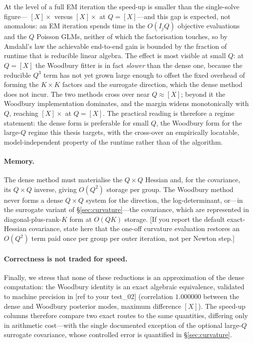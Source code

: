 At the level of a full EM iteration the speed-up is smaller than the single-solve figure---
$[X]\times$ versus $[X]\times$ at $Q=[X]$---and this gap is expected, not anomalous: an EM
iteration spends time in the $O(I_jQ)$ objective evaluations and the $Q$ Poisson GLMs, neither
of which the factorisation touches, so by Amdahl's law the achievable end-to-end gain is
bounded by the fraction of runtime that is reducible linear algebra. The effect is most
visible at small $Q$: at $Q=[X]$ the Woodbury fitter is in fact \emph{slower} than the dense
one, because the reducible $Q^3$ term has not yet grown large enough to offset the fixed
overhead of forming the $K\times K$ factors and the surrogate direction, which the dense
method does not incur. The two methods cross over near $Q\approx[X]$; beyond it the Woodbury
implementation dominates, and the margin widens monotonically with $Q$, reaching $[X]\times$
at $Q=[X]$. The practical reading is therefore a regime statement: the dense form is preferable
for small $Q$, the Woodbury form for the large-$Q$ regime this thesis targets, with the
cross-over an empirically locatable, model-independent property of the runtime rather than of
the algorithm.

\paragraph{Memory.}
The dense method must materialise the $Q\times Q$ Hessian and, for the covariance, its
$Q\times Q$ inverse, giving $O(Q^2)$ storage per group. The Woodbury method never forms a
dense $Q\times Q$ system for the direction, the log-determinant, or---in the surrogate variant
of \S\ref{sec:curvature}---the covariance, which are represented in diagonal-plus-rank-$K$ form
at $O(QK)$ storage. [If you report the default exact-Hessian covariance, state here that the
one-off curvature evaluation restores an $O(Q^2)$ term paid once per group per outer iteration,
not per Newton step.]

\paragraph{Correctness is not traded for speed.}
Finally, we stress that none of these reductions is an approximation of the dense computation:
the Woodbury identity is an exact algebraic equivalence, validated to machine precision in
[ref to your test\_02] (correlation $1.000000$ between the dense and Woodbury posterior modes,
maximum difference $[X]$). The speed-up columns therefore compare two exact routes to the same
quantities, differing only in arithmetic cost---with the single documented exception of the
optional large-$Q$ surrogate covariance, whose controlled error is quantified in
\S\ref{sec:curvature}.
\fi




